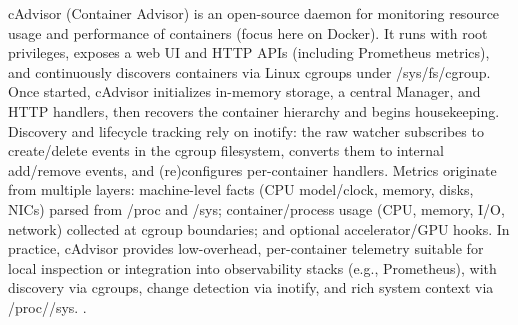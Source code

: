 cAdvisor (Container Advisor) is an open-source daemon for monitoring resource usage and performance of containers (focus here on Docker). It runs with root privileges, exposes a web UI and HTTP APIs (including Prometheus metrics), and continuously discovers containers via Linux cgroups under /sys/fs/cgroup. Once started, cAdvisor initializes in-memory storage, a central Manager, and HTTP handlers, then recovers the container hierarchy and begins housekeeping. Discovery and lifecycle tracking rely on inotify: the raw watcher subscribes to create/delete events in the cgroup filesystem, converts them to internal add/remove events, and (re)configures per-container handlers. Metrics originate from multiple layers: machine-level facts (CPU model/clock, memory, disks, NICs) parsed from /proc and /sys; container/process usage (CPU, memory, I/O, network) collected at cgroup boundaries; and optional accelerator/GPU hooks. In practice, cAdvisor provides low-overhead, per-container telemetry suitable for local inspection or integration into observability stacks (e.g., Prometheus), with discovery via cgroups, change detection via inotify, and rich system context via /proc//sys. \cite{Tolaram2023}.

